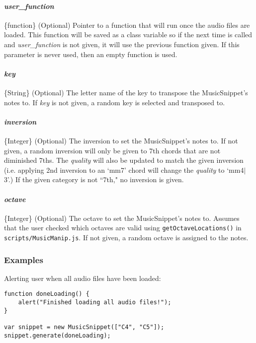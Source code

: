 \documentclass{article}
\begin{document}
\paragraph{\textit{user\_function}} \{function\} (Optional) Pointer to a function that will run once the audio files are loaded. This function will be saved as a class variable so if the next time  is called and \textit{user\_function} is not given, it will use the previous function given. If this parameter is never used, then an empty function is used.

\paragraph{\textit{key}} \{String\} (Optional) The letter name of the key to transpose the MusicSnippet's notes to. If \textit{key} is not given, a random key is selected and transposed to.

\paragraph{\textit{inversion}} \{Integer\} (Optional) The inversion to set the MusicSnippet's notes to. If not given, a random inversion will only be given to 7th chords that are not diminished 7ths. The \textit{quality} will also be updated to match the given inversion (i.e. applying 2nd inversion to an `mm7' chord will change the \textit{quality} to `mm4$\vert$3'.) If the given category is not ``7th," no inversion is given.

\paragraph{\textit{octave}} \{Integer\} (Optional) The octave to set the MusicSnippet's notes to. Assumes that the user checked which octaves are valid using \texttt{getOctaveLocations()} in \texttt{scripts/MusicManip.js}. If not given, a random octave is assigned to the notes.

\subsubsection{Examples}
Alerting user when all audio files have been loaded:
\begin{lstlisting}
function doneLoading() {
    alert("Finished loading all audio files!");
}

var snippet = new MusicSnippet(["C4", "C5"]);
snippet.generate(doneLoading);
\end{lstlisting}
\end{document}
